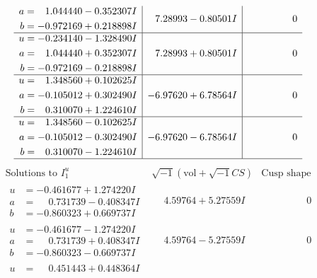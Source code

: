 \documentclass[1p]{elsarticle_modified}
\theoremstyle{definition}
\newcommand{\I}{\sqrt{-1}}
\begin{document}
$$\begin{array}{c|c|c}
\begin{aligned}
a &= \phantom{-}1.044440 - 0.352307 I \\
b &= -0.972169 + 0.218898 I\end{aligned}
 & \phantom{-}7.28993 - 0.80501 I & \phantom{-0.000000 } 0 \\ \hline\begin{aligned}
u &= -0.234140 - 1.328490 I \\
a &= \phantom{-}1.044440 + 0.352307 I \\
b &= -0.972169 - 0.218898 I\end{aligned}
 & \phantom{-}7.28993 + 0.80501 I & \phantom{-0.000000 } 0 \\ \hline\begin{aligned}
u &= \phantom{-}1.348560 + 0.102625 I \\
a &= -0.105012 + 0.302490 I \\
b &= \phantom{-}0.310070 + 1.224610 I\end{aligned}
 & -6.97620 + 6.78564 I & \phantom{-0.000000 } 0 \\ \hline\begin{aligned}
u &= \phantom{-}1.348560 - 0.102625 I \\
a &= -0.105012 - 0.302490 I \\
b &= \phantom{-}0.310070 - 1.224610 I\end{aligned}
 & -6.97620 - 6.78564 I & \phantom{-0.000000 } 0\\
 \hline 
 \end{array}$$\newpage$$\begin{array}{c|c|c}  
\text{Solutions to }I^u_{1}& \I (\text{vol} + \sqrt{-1}CS) & \text{Cusp shape}\\
 \hline 
\begin{aligned}
u &= -0.461677 + 1.274220 I \\
a &= \phantom{-}0.731739 - 0.408347 I \\
b &= -0.860323 + 0.669737 I\end{aligned}
 & \phantom{-}4.59764 + 5.27559 I & \phantom{-0.000000 } 0 \\ \hline\begin{aligned}
u &= -0.461677 - 1.274220 I \\
a &= \phantom{-}0.731739 + 0.408347 I \\
b &= -0.860323 - 0.669737 I\end{aligned}
 & \phantom{-}4.59764 - 5.27559 I & \phantom{-0.000000 } 0 \\ \hline\begin{aligned}
u &= \phantom{-}0.451443 + 0.448364 I \\

\end{aligned}
\end{array}$$
\end{document}
